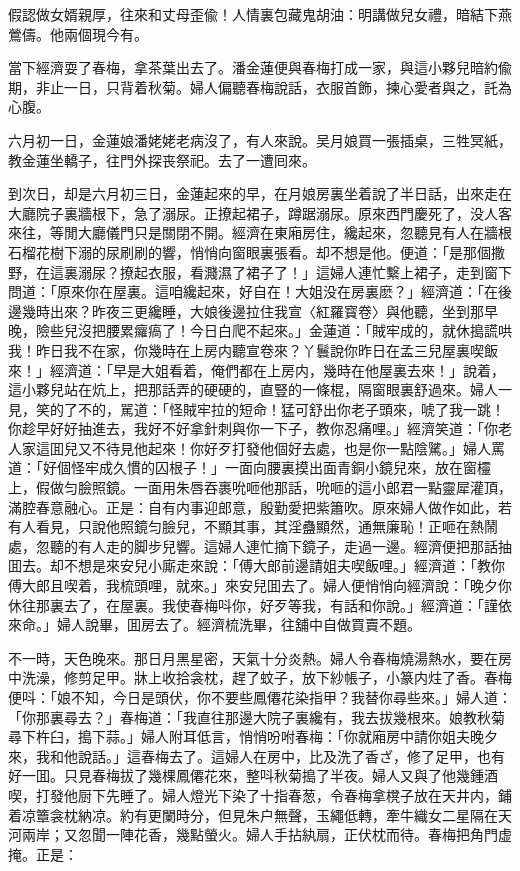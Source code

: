 假認做女婿親厚，往來和丈母歪偸！人情裏包藏鬼胡油：明講做兒女禮，暗結下燕鶯儔。他兩個現今有。

當下經濟耍了春梅，拿茶葉出去了。潘金蓮便與春梅打成一家，與這小夥兒暗約偸期，非止一日，只背着秋菊。婦人偏聽春梅說話，衣服首飾，揀心愛者與之，託為心腹。

六月初一日，金蓮娘潘姥姥老病沒了，有人來說。吴月娘買一張插桌，三牲冥紙，教金蓮坐轎子，往門外探丧祭祀。去了一遭囘來。

到次日，却是六月初三日，金蓮起來的早，在月娘房裏坐着說了半日話，出來走在大廳院子裏牆根下，急了溺尿。正撩起裙子，蹲踞溺尿。原來西門慶死了，没人客來往，等閒大廳儀門只是關閉不開。經濟在東廂房住，纔起來，忽聽見有人在牆根石榴花樹下溺的尿刷刷的響，悄悄向窗眼裏張看。却不想是他。便道：「是那個撒野，在這裏溺尿？撩起衣服，看濺濕了裙子了！」這婦人連忙繫上裙子，走到窗下問道：「原來你在屋裏。這咱纔起來，好自在！大姐没在房裏麽？」經濟道：「在後邊幾時出來？昨夜三更纔睡，大娘後邊拉住我宣〈紅羅寳卷〉與他聽，坐到那早晚，險些兒沒把腰累㿚瘑了！今日白爬不起來。」金蓮道：「賊牢成的，就休搗謊哄我！昨日我不在家，你幾時在上房内聽宣卷來？丫鬟說你昨日在孟三兒屋裏喫飯來！」經濟道：「早是大姐看着，俺們都在上房内，幾時在他屋裏去來！」說着，這小夥兒站在炕上，把那話弄的硬硬的，直豎的一條棍，隔窗眼裏舒過來。婦人一見，笑的了不的，駡道：「怪賊牢拉的短命！猛可舒出你老子頭來，唬了我一跳！你趁早好好抽進去，我好不好拿針刺與你一下子，教你忍痛哩。」經濟笑道：「你老人家這囬兒又不待見他起來！你好歹打發他個好去處，也是你一點陰騭。」婦人罵道：「好個怪牢成久慣的囚根子！」一面向腰裏摸出面青銅小鏡兒來，放在窗欞上，假做匀臉照鏡。一面用朱唇吞裹吮咂他那話，吮咂的這小郎君一點靈犀灌頂，滿腔春意融心。正是：自有内事迎郎意，殷勤愛把紫簫吹。原來婦人做作如此，若有人看見，只說他照鏡匀臉兒，不顯其事，其淫蠱顯然，通無廉恥！正咂在熱鬧處，忽聽的有人走的脚步兒響。這婦人連忙摘下鏡子，走過一邊。經濟便把那話抽囬去。却不想是來安兒小廝走來說：「傅大郎前邊請姐夫喫飯哩。」經濟道：「教你傅大郎且喫着，我梳頭哩，就來。」來安兒囬去了。婦人便悄悄向經濟說：「晚夕你休往那裏去了，在屋裏。我使春梅呌你，好歹等我，有話和你說。」經濟道：「謹依來命。」婦人說畢，囬房去了。經濟梳洗畢，往舖中自做買賣不題。

不一時，天色晚來。那日月黑星密，天氣十分炎熱。婦人令春梅燒湯熱水，要在房中洗澡，修剪足甲。牀上收拾衾枕，趕了蚊子，放下紗帳子，小篆内炷了香。春梅便呌：「娘不知，今日是頭伏，你不要些鳳僊花染指甲？我替你尋些來。」婦人道：「你那裏尋去？」春梅道：「我直往那邊大院子裏纔有，我去拔幾根來。娘教秋菊尋下杵臼，搗下蒜。」婦人附耳低言，悄悄吩咐春梅：「你就廂房中請你姐夫晚夕來，我和他說話。」這春梅去了。這婦人在房中，比及洗了香ざ，修了足甲，也有好一囬。只見春梅拔了幾棵鳳僊花來，整呌秋菊搗了半夜。婦人又與了他幾鍾酒喫，打發他厨下先睡了。婦人燈光下染了十指春葱，令春梅拿櫈子放在天井内，鋪着凉簟衾枕納凉。約有更闌時分，但見朱户無聲，玉繩低轉，牽牛織女二星隔在天河兩岸；又忽聞一陣花香，幾點螢火。婦人手拈紈扇，正伏枕而待。春梅把角門虚掩。正是：

